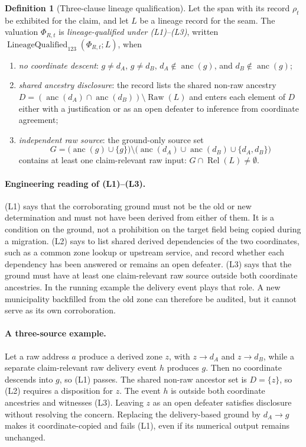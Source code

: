 \documentclass[11pt]{article}
\theoremstyle{definition}
\newtheorem{definition}{Definition}[section]
\begin{document}
\begin{definition}[Three-clause lineage qualification]\label{ex:def:lineage-qualified-three}
Let the span with its record $\rho_t$ be exhibited for the claim, and let $L$ be a lineage record for the seam. The valuation $\Phi_{R,t}$ is \emph{lineage-qualified under (L1)--(L3)}, written $\operatorname{LineageQualified}_{123}(\Phi_{R,t};L)$, when
\begin{enumerate}
\item[(L1)] \emph{no coordinate descent}: $g\neq d_A$, $g\neq d_B$, $d_A\notin\operatorname{anc}(g)$, and $d_B\notin\operatorname{anc}(g)$;
\item[(L2)] \emph{shared ancestry disclosure}: the record lists the shared non-raw ancestry $D=(\operatorname{anc}(d_A)\cap\operatorname{anc}(d_B))\setminus\operatorname{Raw}(L)$ and enters each element of $D$ either with a justification or as an open defeater to inference from coordinate agreement;
\item[(L3)] \emph{independent raw source}: the ground-only source set
\[
G=\bigl(\operatorname{anc}(g)\cup\{g\}\bigr)\setminus
\bigl(\operatorname{anc}(d_A)\cup\operatorname{anc}(d_B)\cup\{d_A,d_B\}\bigr)
\]
contains at least one claim-relevant raw input: $G\cap\operatorname{Rel}(L)\neq\emptyset$.
\end{enumerate}
\end{definition}

\paragraph{Engineering reading of (L1)--(L3).} (L1) says that the corroborating ground must not be the old or new determination and must not have been derived from either of them. It is a condition on the ground, not a prohibition on the target field being copied during a migration. (L2) says to list shared derived dependencies of the two coordinates, such as a common zone lookup or upstream service, and record whether each dependency has been answered or remains an open defeater. (L3) says that the ground must have at least one claim-relevant raw source outside both coordinate ancestries. In the running example the delivery event plays that role. A new municipality backfilled from the old zone can therefore be audited, but it cannot serve as its own corroboration.

\paragraph{A three-source example.} Let a raw address $a$ produce a derived zone $z$, with $z\to d_A$ and $z\to d_B$, while a separate claim-relevant raw delivery event $h$ produces $g$. Then no coordinate descends into $g$, so (L1) passes. The shared non-raw ancestor set is $D=\{z\}$, so (L2) requires a disposition for $z$. The event $h$ is outside both coordinate ancestries and witnesses (L3). Leaving $z$ as an open defeater satisfies disclosure without resolving the concern. Replacing the delivery-based ground by $d_A\to g$ makes it coordinate-copied and fails (L1), even if its numerical output remains unchanged.
\end{document}
